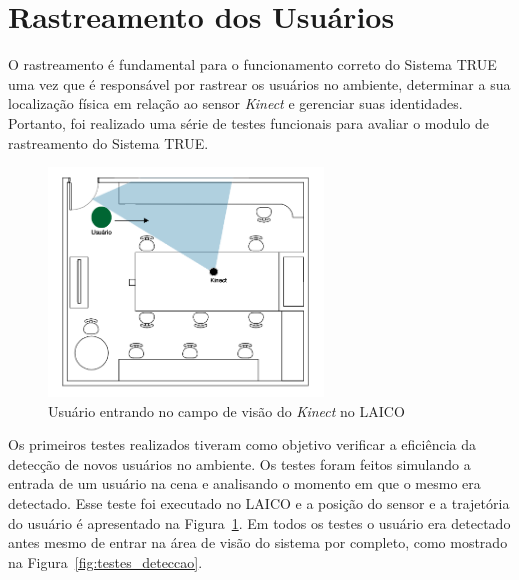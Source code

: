 \section{Rastreamento dos Usuários}

	O rastreamento é fundamental para o funcionamento correto do Sistema TRUE uma
	vez que é responsável por rastrear os usuários no ambiente, determinar a sua localização
	física em relação ao sensor \textit{Kinect} e gerenciar suas identidades.
	Portanto, foi realizado uma série de testes funcionais para avaliar o modulo de
	rastreamento do Sistema TRUE.
		
	\begin{figure}[htb]
		\begin{center}
 			\includegraphics[width=0.65\textwidth]{figuras/5.Testes/laico-teste-deteccao.png}
 		\end{center}
 		\caption{Usuário entrando no campo de visão do \textit{Kinect} no LAICO}
		\label{fig:laico-teste-deteccao}
	\end{figure}		
	
	Os primeiros testes realizados tiveram como objetivo verificar a eficiência da
	detecção de novos usuários no ambiente. Os testes foram feitos simulando a
	entrada de um usuário na cena e analisando o momento em que o mesmo era
	detectado. Esse teste foi executado no LAICO e a posição do sensor e a
	trajetória do usuário é apresentado na Figura~\ref{fig:laico-teste-deteccao}. Em
	todos os testes o usuário era detectado antes mesmo de entrar na área de visão
	do sistema por completo, como mostrado na Figura~\ref{fig:testes_deteccao}.
	
